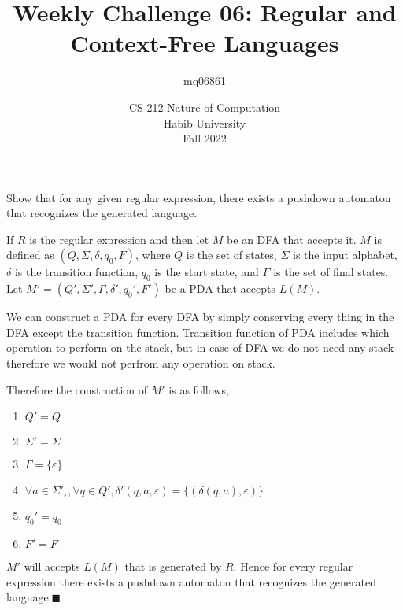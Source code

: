 \documentclass[a4paper]{exam}
\title{Weekly Challenge 06: Regular and Context-Free Languages}
\author{mq06861} %
\date{CS 212 Nature of Computation\\Habib University\\Fall 2022}
\begin{document}
\maketitle

\begin{questions}


	Show that for any given regular expression, there exists a pushdown automaton that recognizes the generated language.

	\begin{solution}
		If \(R\) is the regular expression and then let \(M\) be an DFA that accepts it. \(M\) is defined as \((Q,\Sigma, \delta,q_0,F)\), where \(Q\) is the set of states, \(\Sigma\) is the input alphabet, \(\delta\) is the transition function, \(q_0\) is the start state, and \(F\) is the set of final states. Let \(M' = (Q',\Sigma',\Gamma,\delta',q_0',F')\) be a PDA that accepts \(L(M)\).
		
		We can construct a PDA for every DFA by simply conserving every thing in the DFA except the transition function. Transition function of PDA includes which operation to perform on the stack, but in case of DFA we do not need any stack therefore we would not perfrom any operation on stack.
		
		Therefore the construction of \(M'\) is as follows,
		\begin{enumerate}
			\item \(Q' = Q\)
			\item \(\Sigma'=\Sigma\)
			\item \(\Gamma=\{\varepsilon\}\)
			\item \(\forall a\in\Sigma'_{\varepsilon},\forall q\in Q',\delta'(q,a,\varepsilon) = \{(\delta(q,a),\varepsilon)\}\)
			\item \(q_0'=q_0\)
			\item \(F'=F\)
		\end{enumerate}
		\(M'\) will accepts \(L(M)\) that is generated by \(R\). Hence for every regular expression there exists a pushdown automaton that recognizes the generated language.\hfill\(\blacksquare\)
	\end{solution}
	\end{questions}
\end{document}
